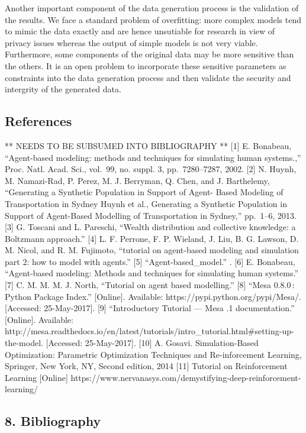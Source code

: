 \documentclass[]{article}
\begin{document}
Another important component of the data generation process is the
validation of the results. We face a standard problem of overfitting:
more complex models tend to mimic the data exactly and are hence
unsutiable for research in view of privacy issues whereas the output of
simple models is not very viable. Furthermore, some components of the
original data may be more sensitive than the others. It is an open
problem to incorporate these sensitive parameters as constraints into
the data generation process and then validate the security and
intergrity of the generated data.

\subsection{References}\label{references}
** NEEDS TO BE SUBSUMED INTO BIBLIOGRAPHY **
{[}1{]} E. Bonabeau, ``Agent-based modeling: methods and techniques for
simulating human systems.,'' Proc. Natl. Acad. Sci., vol.~99, no. suppl.
3, pp.~7280--7287, 2002. {[}2{]} N. Huynh, M. Namazi-Rad, P. Perez, M.
J. Berryman, Q. Chen, and J. Barthelemy, ``Generating a Synthetic
Population in Support of Agent- Based Modeling of Transportation in
Sydney Huynh et al., Generating a Synthetic Population in Support of
Agent-Based Modelling of Transportation in Sydney,'' pp.~1--6, 2013.
{[}3{]} G. Toscani and L. Pareschi, ``Wealth distribution and collective
knowledge: a Boltzmann approach.'' {[}4{]} L. F. Perrone, F. P. Wieland,
J. Liu, B. G. Lawson, D. M. Nicol, and R. M. Fujimoto, ``tutorial on
agent-based modeling and simulation part 2: how to model with agents.''
{[}5{]} ``Agent-based\_model.'' . {[}6{]} E. Bonabeau, ``Agent-based
modeling: Methods and techniques for simulating human systems.'' {[}7{]}
C. M. M. M. J. North, ``Tutorial on agent based modelling.'' {[}8{]}
``Mesa 0.8.0\,: Python Package Index.'' {[}Online{]}. Available:
https://pypi.python.org/pypi/Mesa/. {[}Accessed: 25-May-2017{]}. {[}9{]}
``Introductory Tutorial --- Mesa .1 documentation.'' {[}Online{]}.
Available:
http://mesa.readthedocs.io/en/latest/tutorials/intro\_tutorial.html\#setting-up-the-model.
{[}Accessed: 25-May-2017{]}. {[}10{]} A. Gosavi. Simulation-Based
Optimization: Parametric Optimization Techniques and Re-inforcement
Learning, Springer, New York, NY, Second edition, 2014 {[}11{]} Tutorial
on Reinforcement Learning {[}Online{]}
https://www.nervanasys.com/demystifying-deep-reinforcement-learning/

\subsection{8. Bibliography}\label{bibliography}
\end{document}
